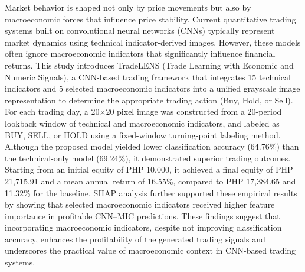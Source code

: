 
Market behavior is shaped not only by price movements but also by macroeconomic forces that influence price stability. Current quantitative trading systems built on convolutional neural networks (CNNs) typically represent market dynamics using technical indicator-derived images. However, these models often ignore macroeconomic indicators that significantly influence financial returns. This study introduces TradeLENS (Trade Learning with Economic and Numeric Signals), a CNN-based trading framework that integrates 15 technical indicators and 5 selected macroeconomic indicators into a unified grayscale image representation to determine the appropriate trading action (Buy, Hold, or Sell). For each trading day, a 20$\times$20 pixel image was constructed from a 20-period lookback window of technical and macroeconomic indicators, and labeled as BUY, SELL, or HOLD using a fixed-window turning-point labeling method. Although the proposed model yielded lower classification accuracy (64.76\%) than the technical-only model (69.24\%), it demonstrated superior trading outcomes. Starting from an initial equity of PHP 10,000, it achieved a final equity of PHP 21,715.91 and a mean annual return of 16.55\%, compared to PHP 17,384.65 and 11.32\% for the baseline. SHAP analysis further supported these empirical results by showing that selected macroeconomic indicators received higher feature importance in profitable CNN--MIC predictions. These findings suggest that incorporating macroeconomic indicators, despite not improving classification accuracy, enhances the profitability of the generated trading signals and underscores the practical value of macroeconomic context in CNN-based trading systems.


